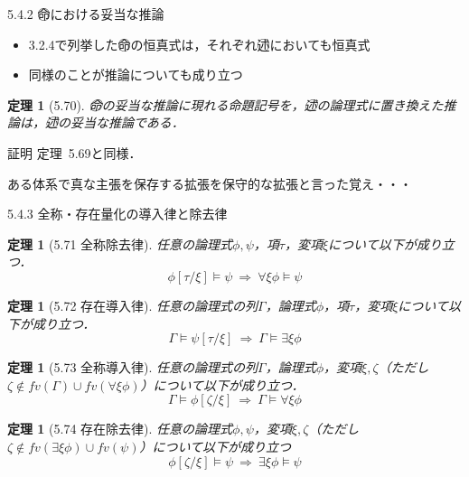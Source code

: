 \documentclass[dvipdfmx,11pt]{beamer}
\newcommand{\predl}{\textcircled{\scriptsize 述}}
\newcommand{\propl}{\textcircled{\scriptsize 命}}
\newtheorem{theo}[theorem]{定理}
\begin{document}
\begin{frame}{5.4.2 \propl{}における妥当な推論}
  \begin{itemize}
  \item 3.2.4で列挙した\propl{}の恒真式は，それぞれ\predl{}においても恒真式
  \item 同様のことが推論についても成り立つ
  \end{itemize}

  \begin{theo}[5.70]
    \propl{}の妥当な推論に現れる命題記号を，\predl{}の論理式に置き換えた推論は，\predl{}の妥当な推論である．
  \end{theo}

  \begin{block}{証明}
    定理~5.69と同様．
  \end{block}

  \mbox{}

  ある体系で真な主張を保存する拡張を保守的な拡張と言った覚え・・・
\end{frame}

\begin{frame}{5.4.3 全称・存在量化の導入律と除去律}
  \fontsize{9pt}{7.2}\selectfont
  \begin{theo}[5.71 全称除去律]
    任意の論理式\(\phi,\psi\)，項\(\tau\)，変項\(\xi\)について以下が成り立つ．
    \[
    \phi [ \tau / \xi ] \vDash \psi \ \Longrightarrow \ \forall \xi \phi \vDash \psi
    \]
  \end{theo}
  \begin{theo}[5.72 存在導入律]
    任意の論理式の列\(\Gamma\)，論理式\(\phi\)，項\(\tau\)，変項\(\xi\)について以下が成り立つ．
    \[
    \Gamma \vDash \psi [ \tau / \xi ] \ \Longrightarrow \ \Gamma \vDash \exists \xi \phi
    \]
  \end{theo}
  \begin{theo}[5.73 全称導入律]
    任意の論理式の列\(\Gamma\)，論理式\(\phi\)，変項\(\xi,\zeta\)（ただし\(\zeta \notin \textit{fv}(\Gamma) \cup \textit{fv}(\forall \xi \phi)\)）について以下が成り立つ．
    \[
    \Gamma \vDash \phi [ \zeta / \xi ] \ \Longrightarrow \ \Gamma \vDash \forall \xi \phi
    \]
  \end{theo}
  \begin{theo}[5.74 存在除去律]
    任意の論理式\(\phi,\psi\)，変項\(\xi,\zeta\)（ただし\(\zeta \notin \textit{fv}(\exists \xi \phi) \cup \textit{fv}(\psi)\)）について以下が成り立つ
    \[
    \phi [ \zeta / \xi ] \vDash \psi \ \Longrightarrow \ \exists \xi \phi \vDash \psi
    \]
  \end{theo}
\end{frame}
\end{document}
